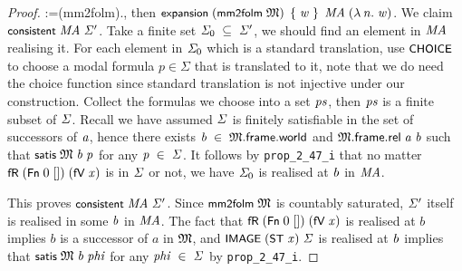 \documentclass[letterpaper]{article}
\renewcommand{\HOLConst}[1]{{\textsf{\upshape\small #1}}}
\renewcommand{\HOLinline}[1]{\ensuremath{#1}}
\begin{document}
\begin{proof}
{\;\;\;\;\;\;\;:=\;(\HOLConst{mm2folm}\;).\HOLTokenRightrec{}}, then \HOLinline{\HOLConst{expansion}\;(\HOLConst{mm2folm}\;\HOLFreeVar{\ensuremath{\mathfrak{M}}})\;\HOLTokenLeftbrace{}\HOLFreeVar{w}\HOLTokenRightbrace{}\;\HOLFreeVar{MA}\;(\HOLTokenLambda{}\HOLBoundVar{n}.\;\HOLFreeVar{w})}. We claim \HOLinline{\HOLConst{consistent}\;\HOLFreeVar{MA}\;\HOLFreeVar{\ensuremath{\Sigma}\sp{\prime}}}. Take a finite set \HOLinline{\HOLFreeVar{\ensuremath{\Sigma}\sb{\mathrm{0}}}\;\HOLSymConst{\HOLTokenSubset{}}\;\HOLFreeVar{\ensuremath{\Sigma}\sp{\prime}}}, we should find an element in \HOLinline{\HOLFreeVar{MA}} realising it. For each element in \HOLinline{\HOLFreeVar{\ensuremath{\Sigma}\sb{\mathrm{0}}}} which is a standard translation, use \HOLinline{\HOLConst{CHOICE}} to choose a modal formula $p\in \Sigma$ that is translated to it, note that we do need the choice function since standard translation is not injective under our construction. Collect the formulas we choose into a set \HOLinline{\HOLFreeVar{ps}}, then \HOLinline{\HOLFreeVar{ps}} is a finite subset of \HOLinline{\HOLFreeVar{\ensuremath{\Sigma}}}. Recall we have assumed \HOLinline{\HOLFreeVar{\ensuremath{\Sigma}}} is finitely satisfiable in the set of successors of \HOLinline{\HOLFreeVar{a}}, hence there exists \HOLinline{\HOLFreeVar{b}\;\HOLSymConst{\HOLTokenIn{}}\;\HOLFreeVar{\ensuremath{\mathfrak{M}}}.\HOLFieldName{frame}.\HOLFieldName{world}} and \HOLinline{\HOLFreeVar{\ensuremath{\mathfrak{M}}}.\HOLFieldName{frame}.\HOLFieldName{rel}\;\HOLFreeVar{a}\;\HOLFreeVar{b}} such that \HOLinline{\HOLConst{satis}\;\HOLFreeVar{\ensuremath{\mathfrak{M}}}\;\HOLFreeVar{b}\;\HOLFreeVar{p}} for any \HOLinline{\HOLFreeVar{p}\;\HOLSymConst{\HOLTokenIn{}}\;\HOLFreeVar{\ensuremath{\Sigma}}}. It follows by \texttt{prop_2_47_i} that no matter \HOLinline{\HOLConst{fR}\;(\HOLConst{Fn}\;\HOLNumLit{0}\;[])\;(\HOLConst{fV}\;\HOLFreeVar{x})} is in \HOLinline{\HOLFreeVar{\ensuremath{\Sigma}}} or not, we have \HOLinline{\HOLFreeVar{\ensuremath{\Sigma}\sb{\mathrm{0}}}} is realised at \HOLinline{\HOLFreeVar{b}} in \HOLinline{\HOLFreeVar{MA}}.

This proves \HOLinline{\HOLConst{consistent}\;\HOLFreeVar{MA}\;\HOLFreeVar{\ensuremath{\Sigma}\sp{\prime}}}. Since \HOLinline{\HOLConst{mm2folm}\;\HOLFreeVar{\ensuremath{\mathfrak{M}}}} is countably saturated, \HOLinline{\HOLFreeVar{\ensuremath{\Sigma}\sp{\prime}}} itself is realised in some \HOLinline{\HOLFreeVar{b}} in \HOLinline{\HOLFreeVar{MA}}. The fact that \HOLinline{\HOLConst{fR}\;(\HOLConst{Fn}\;\HOLNumLit{0}\;[])\;(\HOLConst{fV}\;\HOLFreeVar{x})} is realised at $b$ implies $b$ is a successor of $a$ in \HOLinline{\HOLFreeVar{\ensuremath{\mathfrak{M}}}}, and \HOLinline{\HOLConst{IMAGE}\;(\HOLConst{ST}\;\HOLFreeVar{x})\;\HOLFreeVar{\ensuremath{\Sigma}}} is realised at \HOLinline{\HOLFreeVar{b}} implies that \HOLinline{\HOLConst{satis}\;\HOLFreeVar{\ensuremath{\mathfrak{M}}}\;\HOLFreeVar{b}\;\HOLFreeVar{phi}} for any \HOLinline{\HOLFreeVar{phi}\;\HOLSymConst{\HOLTokenIn{}}\;\HOLFreeVar{\ensuremath{\Sigma}}} by \texttt{prop_2_47_i}.
\end{proof}
\end{document}
